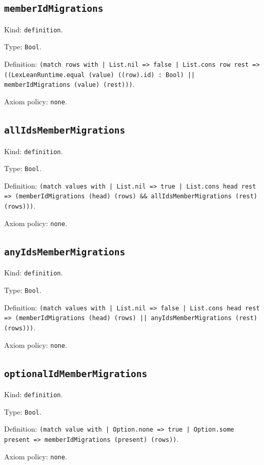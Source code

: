 \documentclass[11pt]{article}
\begin{document}
\subsection*{\texttt{memberIdMigrations}}
\noindent Kind: \texttt{definition}.\par
\noindent Type: \texttt{Bool}.\par
\noindent Definition: \texttt{(match rows with | List.nil => false | List.cons row rest => ((LexLeanRuntime.equal (value) ((row).id) : Bool) || memberIdMigrations (value) (rest)))}.\par
\noindent Axiom policy: \texttt{none}.\par
\subsection*{\texttt{allIdsMemberMigrations}}
\noindent Kind: \texttt{definition}.\par
\noindent Type: \texttt{Bool}.\par
\noindent Definition: \texttt{(match values with | List.nil => true | List.cons head rest => (memberIdMigrations (head) (rows) \&\& allIdsMemberMigrations (rest) (rows)))}.\par
\noindent Axiom policy: \texttt{none}.\par
\subsection*{\texttt{anyIdsMemberMigrations}}
\noindent Kind: \texttt{definition}.\par
\noindent Type: \texttt{Bool}.\par
\noindent Definition: \texttt{(match values with | List.nil => false | List.cons head rest => (memberIdMigrations (head) (rows) || anyIdsMemberMigrations (rest) (rows)))}.\par
\noindent Axiom policy: \texttt{none}.\par
\subsection*{\texttt{optionalIdMemberMigrations}}
\noindent Kind: \texttt{definition}.\par
\noindent Type: \texttt{Bool}.\par
\noindent Definition: \texttt{(match value with | Option.none => true | Option.some present => memberIdMigrations (present) (rows))}.\par
\noindent Axiom policy: \texttt{none}.\par
\end{document}
